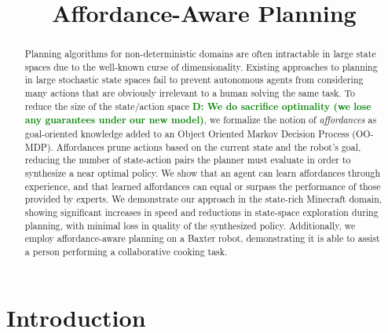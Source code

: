 \documentclass[conference]{IEEEtran}
\newcommand{\dnote}[1]{\textcolor{Green}{\textbf{D: #1}}}
\begin{document}
\title{Affordance-Aware Planning}


\maketitle

\begin{abstract}
Planning algorithms for non-deterministic domains are often
intractable in large state spaces due to the well-known curse of
dimensionality. Existing approaches to planning in large stochastic
state spaces fail to prevent autonomous agents from considering many
actions that are obviously irrelevant to a human solving the same
task. To reduce the size of the state/action space 
\dnote{We do sacrifice optimality (we lose any guarantees under our new model)}, 
we formalize the notion of {\em affordances} as
goal-oriented knowledge added to an Object Oriented Markov Decision
Process (OO-MDP).  Affordances prune actions based on the current
state and the robot's goal, reducing the number of state-action pairs
the planner must evaluate in order to synthesize a near optimal
policy. We show that an agent can learn affordances through
experience, and that learned affordances can equal or surpass the
performance of those provided by experts. We demonstrate our approach
in the state-rich Minecraft domain, showing significant increases in
speed and reductions in state-space exploration during planning, with
minimal loss in quality of the synthesized policy.  Additionally, we
employ affordance-aware planning on a Baxter robot, demonstrating it
is able to assist a person performing a collaborative cooking task.
\end{abstract}

\IEEEpeerreviewmaketitle

\section{Introduction}
\label{sec:introduction}
\end{document}
